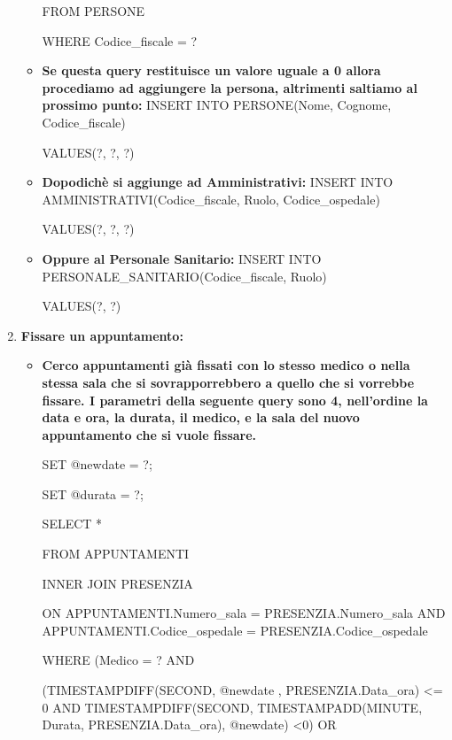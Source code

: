 \documentclass[a4paper,12pt]{report}
\begin{document}
\begin{enumerate}[leftmargin=0cm,itemindent=.5cm,labelwidth=\itemindent,labelsep=0cm,align=left]
\begin{itemize}
        FROM PERSONE

        WHERE Codice\_fiscale = ?

        \item \textbf{Se questa query restituisce un valore uguale a 0 allora procediamo ad aggiungere la persona, 
        altrimenti saltiamo al prossimo punto:} \newline
        INSERT INTO PERSONE(Nome, Cognome, Codice\_fiscale)

        VALUES(?, ?, ?)

        \item \textbf{Dopodichè si aggiunge ad Amministrativi:} \newline
        INSERT INTO AMMINISTRATIVI(Codice\_fiscale, Ruolo, Codice\_ospedale)

        VALUES(?, ?, ?)

        \item \textbf{Oppure al Personale Sanitario:} \newline
        INSERT INTO PERSONALE\_SANITARIO(Codice\_fiscale, Ruolo)

        VALUES(?, ?)

    \end{itemize}
    \item \textbf{Fissare un appuntamento:} 
    \begin{itemize}
        \item \textbf{Cerco appuntamenti già fissati con lo stesso medico o nella stessa sala che si sovrapporrebbero a quello che si vorrebbe fissare.
        I parametri della seguente query sono 4, nell'ordine la data e ora, la durata, il medico, e la sala del nuovo appuntamento che si vuole fissare.} \newline
        
        SET @newdate = ?;

        SET @durata = ?;

        SELECT *

        FROM APPUNTAMENTI

        INNER JOIN PRESENZIA

        ON APPUNTAMENTI.Numero\_sala = PRESENZIA.Numero\_sala AND APPUNTAMENTI.Codice\_ospedale = PRESENZIA.Codice\_ospedale
        
        WHERE (Medico = ? AND

            (TIMESTAMPDIFF(SECOND, @newdate , PRESENZIA.Data\_ora) \textless= 0 AND TIMESTAMPDIFF(SECOND, TIMESTAMPADD(MINUTE, Durata, PRESENZIA.Data\_ora), @newdate) \textless 0) OR
            

\end{itemize}
\end{enumerate}
\end{document}
